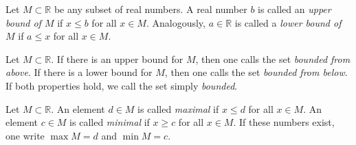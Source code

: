 

\begin{Definition}
Let $M \subset \mathbb{R}$ be any subset of real numbers. A real number $b$ is called an \emph{upper bound of $M$}
if $x \leq b$ for all $x \in M$. Analogously, $a \in \mathbb{R}$ is called a \emph{lower bound of $M$}
if $a \leq x$ for all $x \in M$.
\end{Definition}

\begin{Definition}
Let $M \subset \mathbb{R}$. If there is an upper bound for $M$, then
one calls the set \emph{bounded from above}. 
If there is a lower bound for $M$, then
one calls the set \emph{bounded from below}. If both properties hold, we call the set simply \emph{bounded}.
\end{Definition}

\begin{Definition}
Let $M \subset \mathbb{R}$. An element $d \in M$ is called \emph{maximal} if
$ x\leq d$ for all $x \in M$. An element $c \in M$ is called \emph{minimal} if
$ x\geq c$ for all $x \in M$. If these numbers exist, one write $\max M = d$
and $\min M = c$.
\end{Definition}

